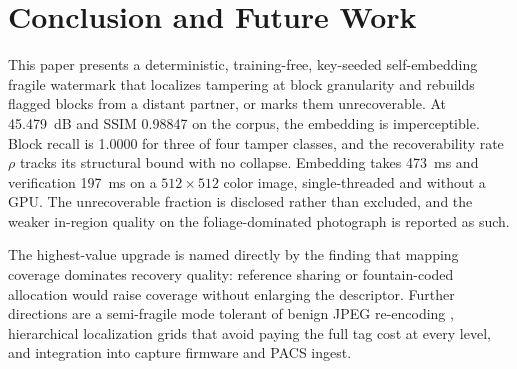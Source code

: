 \documentclass[conference]{IEEEtran}
\begin{document}
\section{Conclusion and Future Work}
\label{sec:conclusion}

This paper presents a deterministic, training-free, key-seeded self-embedding fragile watermark that localizes tampering at block granularity and rebuilds flagged blocks from a distant partner, or marks them unrecoverable. At 45.479~dB and SSIM 0.98847 on the corpus, the embedding is imperceptible. Block recall is 1.0000 for three of four tamper classes, and the recoverability rate $\rho$ tracks its structural bound with no collapse. Embedding takes 473~ms and verification 197~ms on a $512\times512$ color image, single-threaded and without a GPU. The unrecoverable fraction is disclosed rather than excluded, and the weaker in-region quality on the foliage-dominated photograph is reported as such.

The highest-value upgrade is named directly by the finding that mapping coverage dominates recovery quality: reference sharing or fountain-coded allocation \cite{zhang2011reference,korus2013efficient} would raise coverage without enlarging the descriptor. Further directions are a semi-fragile mode tolerant of benign JPEG re-encoding \cite{linchang2000}, hierarchical localization grids that avoid paying the full tag cost at every level, and integration into capture firmware and PACS ingest.

\balance
\end{document}
